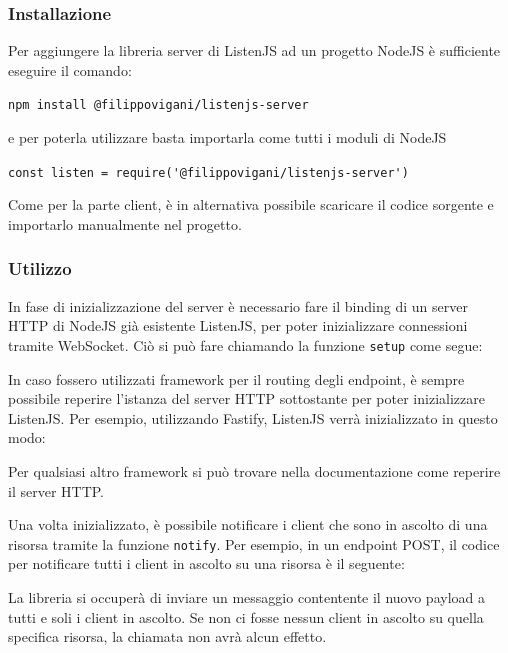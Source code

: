 \documentclass[12pt,a4paper,openright]{report}
\begin{document}
\subsubsection{Installazione}
Per aggiungere la libreria server di ListenJS ad un progetto NodeJS è sufficiente eseguire il comando:
\begin{center}
\lstinline{npm install @filippovigani/listenjs-server}
\end{center}
e per poterla utilizzare basta importarla come tutti i moduli di NodeJS
\begin{center}
\lstinline{const listen = require('@filippovigani/listenjs-server')}
\end{center}
Come per la parte client, è in alternativa possibile scaricare il codice sorgente\cite{listenjs_server_repo} e importarlo manualmente nel progetto.

\subsubsection{Utilizzo}
In fase di inizializzazione del server è necessario fare il binding di un server HTTP di NodeJS già esistente ListenJS, per poter inizializzare connessioni tramite WebSocket. Ciò si può fare chiamando la funzione \lstinline{setup} come segue: 

In caso fossero utilizzati framework per il routing degli endpoint, è sempre possibile reperire l'istanza del server HTTP sottostante per poter inizializzare ListenJS. Per esempio, utilizzando Fastify, ListenJS verrà inizializzato in questo modo:

Per qualsiasi altro framework si può trovare nella documentazione come reperire il server HTTP.

\bigskip

Una volta inizializzato, è possibile notificare i client che sono in ascolto di una risorsa tramite la funzione \lstinline{notify}. Per esempio, in un endpoint POST, il codice per notificare tutti i client in ascolto su una risorsa è il seguente:


La libreria si occuperà di inviare un messaggio contentente il nuovo payload a tutti e soli i client in ascolto. Se non ci fosse nessun client in ascolto su quella specifica risorsa, la chiamata non avrà alcun effetto.

\end{document}
